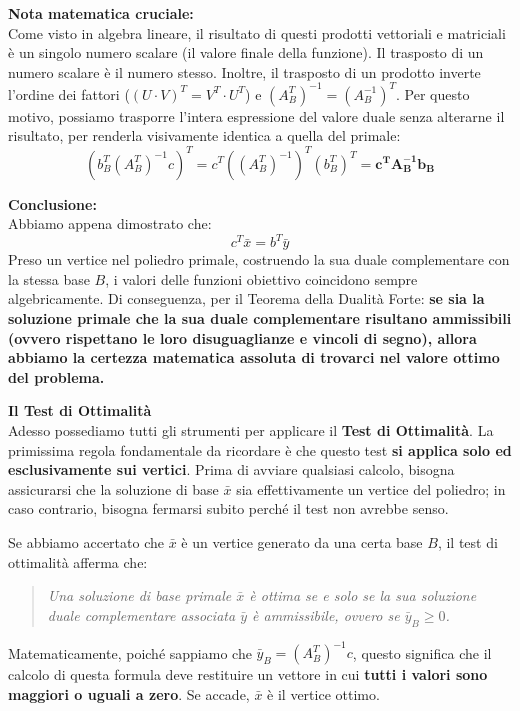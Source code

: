 \documentclass[12pt, a4paper]{article}
\begin{document}
	\textbf{Nota matematica cruciale:}\\
	Come visto in algebra lineare, il risultato di questi prodotti vettoriali e matriciali è un singolo numero scalare (il valore finale della funzione). Il trasposto di un numero scalare è il numero stesso. Inoltre, il trasposto di un prodotto inverte l'ordine dei fattori ($ (U \cdot V)^T = V^T \cdot U^T $) e $(A_B^T)^{-1} = (A_B^{-1})^T$. 
	Per questo motivo, possiamo trasporre l'intera espressione del valore duale senza alterarne il risultato, per renderla visivamente identica a quella del primale:
	\[
	\left( b_B^T (A_B^T)^{-1} c \right)^T = c^T \left( (A_B^T)^{-1} \right)^T (b_B^T)^T = \mathbf{c^T A_B^{-1} b_B}
	\]
	
	\textbf{Conclusione:}\\
	Abbiamo appena dimostrato che:
	\[
	c^T \bar{x} = b^T \bar{y}
	\]
	Preso un vertice nel poliedro primale, costruendo la sua duale complementare con la stessa base $B$, i valori delle funzioni obiettivo coincidono sempre algebricamente.
	Di conseguenza, per il Teorema della Dualità Forte: \textbf{se sia la soluzione primale che la sua duale complementare risultano ammissibili (ovvero rispettano le loro disuguaglianze e vincoli di segno), allora abbiamo la certezza matematica assoluta di trovarci nel valore ottimo del problema.}
	
	\vspace{0.6cm}
	\textbf{Il Test di Ottimalità}\\
	Adesso possediamo tutti gli strumenti per applicare il \textbf{Test di Ottimalità}. 
	La primissima regola fondamentale da ricordare è che questo test \textbf{si applica solo ed esclusivamente sui vertici}. Prima di avviare qualsiasi calcolo, bisogna assicurarsi che la soluzione di base $\bar{x}$ sia effettivamente un vertice del poliedro; in caso contrario, bisogna fermarsi subito perché il test non avrebbe senso.
	
	Se abbiamo accertato che $\bar{x}$ è un vertice generato da una certa base $B$, il test di ottimalità afferma che:
	\begin{quote}
		\textit{Una soluzione di base primale $\bar{x}$ è ottima se e solo se la sua soluzione duale complementare associata $\bar{y}$ è ammissibile, ovvero se $\bar{y}_B \geq 0$.}
	\end{quote}
	Matematicamente, poiché sappiamo che $\bar{y}_B = (A_B^T)^{-1} c$, questo significa che il calcolo di questa formula deve restituire un vettore in cui \textbf{tutti i valori sono maggiori o uguali a zero}. Se accade, $\bar{x}$ è il vertice ottimo.
	
\end{document}
